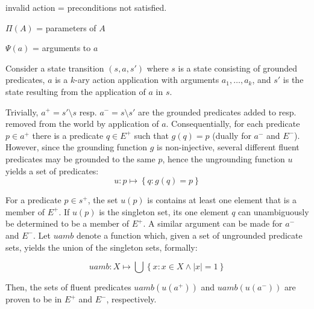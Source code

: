 \documentclass[../master.tex]{subfiles}
\begin{document}
    invalid action = preconditions not satisfied.

    $\Pi(A)$ = parameters of $A$

    $\Psi(a)$ = arguments to $a$

    Consider a state transition $\left(s,a,s'\right)$ where $s$ is a
    state consisting of grounded predicates, $a$ is a $k$-ary action
    application with arguments $a_{1},\dots,a_{k}$, and $s'$ is the
    state resulting from the application of $a$ in $s$.

    Trivially, $a^{+}=s'\setminus s$ resp. $a^{-}=s\setminus s'$ are
    the grounded predicates added to resp. removed from the world by application
    of $a$. Consequentially, for each predicate $p\in a^{+}$ there is
    a predicate $q\in E^{+}$ such that $g\left(q\right)=p$ (dually for
    $a^{-}$ and $E^{-}$). However, since the grounding function $g$
    is non-injective, several different fluent predicates may be grounded
    to the same $p$, hence the ungrounding function $u$ yields a set
    of predicates:
    \[
    u:p\mapsto\left\{ q:g\left(q\right)=p\right\}
    \]


    For a predicate $p\in s^{+}$, the set $u\left(p\right)$ is contains
    at least one element that is a member of $E^{+}$. If $u\left(p\right)$
    is the singleton set, its one element $q$ can unambiguously be determined
    to be a member of $E^{+}$. A similar argument can be made for $a^{-}$
    and $E^{-}$. Let $uamb$ denote a function which, given a set of
    ungrounded predicate sets, yields the union of the singleton sets,
    formally:

    \[
    uamb:X\mapsto\bigcup\left\{ x:x\in X\land\left|x\right|=1\right\}
    \]


    Then, the sets of fluent predicates $uamb\left(u\left(a^{+}\right)\right)$
    and $uamb\left(u\left(a^{-}\right)\right)$ are proven to be in $E^{+}$
    and $E^{-}$, respectively.
\end{document}
